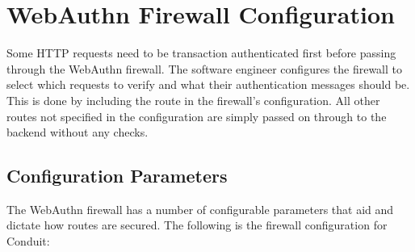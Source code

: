 

\section{WebAuthn Firewall Configuration}


Some HTTP requests need to be transaction authenticated first before passing through the WebAuthn firewall. The software engineer configures the firewall to select which requests to verify and what their authentication messages should be. This is done by including the route in the firewall's configuration. All other routes not specified in the configuration are simply passed on through to the backend without any checks.





\subsection{Configuration Parameters}\label{Sec:ConfigurationParameters}

The WebAuthn firewall has a number of configurable parameters that aid and dictate how routes are secured. The following is the firewall configuration for Conduit:

